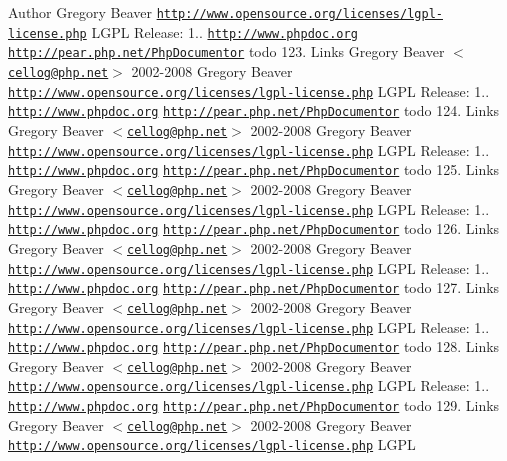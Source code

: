 \begin{DoxyAuthor}{\-Author}
\-Gregory \-Beaver  \href{http://www.opensource.org/licenses/lgpl-license.php}{\tt http\-://www.\-opensource.\-org/licenses/lgpl-\/license.\-php} \-L\-G\-P\-L  \-Release\-: 1..  \href{http://www.phpdoc.org}{\tt http\-://www.\-phpdoc.\-org}  \href{http://pear.php.net/PhpDocumentor}{\tt http\-://pear.\-php.\-net/\-Php\-Documentor}  todo 123.   \-Links  \-Gregory \-Beaver $<$\href{mailto:cellog@php.net}{\tt cellog@php.\-net}$>$  2002-\/2008 \-Gregory \-Beaver  \href{http://www.opensource.org/licenses/lgpl-license.php}{\tt http\-://www.\-opensource.\-org/licenses/lgpl-\/license.\-php} \-L\-G\-P\-L  \-Release\-: 1..  \href{http://www.phpdoc.org}{\tt http\-://www.\-phpdoc.\-org}  \href{http://pear.php.net/PhpDocumentor}{\tt http\-://pear.\-php.\-net/\-Php\-Documentor}  todo 124.   \-Links  \-Gregory \-Beaver $<$\href{mailto:cellog@php.net}{\tt cellog@php.\-net}$>$  2002-\/2008 \-Gregory \-Beaver  \href{http://www.opensource.org/licenses/lgpl-license.php}{\tt http\-://www.\-opensource.\-org/licenses/lgpl-\/license.\-php} \-L\-G\-P\-L  \-Release\-: 1..  \href{http://www.phpdoc.org}{\tt http\-://www.\-phpdoc.\-org}  \href{http://pear.php.net/PhpDocumentor}{\tt http\-://pear.\-php.\-net/\-Php\-Documentor}  todo 125.   \-Links  \-Gregory \-Beaver $<$\href{mailto:cellog@php.net}{\tt cellog@php.\-net}$>$  2002-\/2008 \-Gregory \-Beaver  \href{http://www.opensource.org/licenses/lgpl-license.php}{\tt http\-://www.\-opensource.\-org/licenses/lgpl-\/license.\-php} \-L\-G\-P\-L  \-Release\-: 1..  \href{http://www.phpdoc.org}{\tt http\-://www.\-phpdoc.\-org}  \href{http://pear.php.net/PhpDocumentor}{\tt http\-://pear.\-php.\-net/\-Php\-Documentor}  todo 126.   \-Links  \-Gregory \-Beaver $<$\href{mailto:cellog@php.net}{\tt cellog@php.\-net}$>$  2002-\/2008 \-Gregory \-Beaver  \href{http://www.opensource.org/licenses/lgpl-license.php}{\tt http\-://www.\-opensource.\-org/licenses/lgpl-\/license.\-php} \-L\-G\-P\-L  \-Release\-: 1..  \href{http://www.phpdoc.org}{\tt http\-://www.\-phpdoc.\-org}  \href{http://pear.php.net/PhpDocumentor}{\tt http\-://pear.\-php.\-net/\-Php\-Documentor}  todo 127.   \-Links  \-Gregory \-Beaver $<$\href{mailto:cellog@php.net}{\tt cellog@php.\-net}$>$  2002-\/2008 \-Gregory \-Beaver  \href{http://www.opensource.org/licenses/lgpl-license.php}{\tt http\-://www.\-opensource.\-org/licenses/lgpl-\/license.\-php} \-L\-G\-P\-L  \-Release\-: 1..  \href{http://www.phpdoc.org}{\tt http\-://www.\-phpdoc.\-org}  \href{http://pear.php.net/PhpDocumentor}{\tt http\-://pear.\-php.\-net/\-Php\-Documentor}  todo 128.   \-Links  \-Gregory \-Beaver $<$\href{mailto:cellog@php.net}{\tt cellog@php.\-net}$>$  2002-\/2008 \-Gregory \-Beaver  \href{http://www.opensource.org/licenses/lgpl-license.php}{\tt http\-://www.\-opensource.\-org/licenses/lgpl-\/license.\-php} \-L\-G\-P\-L  \-Release\-: 1..  \href{http://www.phpdoc.org}{\tt http\-://www.\-phpdoc.\-org}  \href{http://pear.php.net/PhpDocumentor}{\tt http\-://pear.\-php.\-net/\-Php\-Documentor}  todo 129.   \-Links  \-Gregory \-Beaver $<$\href{mailto:cellog@php.net}{\tt cellog@php.\-net}$>$  2002-\/2008 \-Gregory \-Beaver  \href{http://www.opensource.org/licenses/lgpl-license.php}{\tt http\-://www.\-opensource.\-org/licenses/lgpl-\/license.\-php} \-L\-G\-P\-L  
\end{DoxyAuthor}

